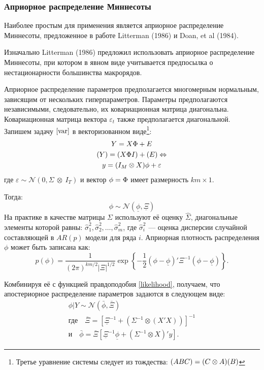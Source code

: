 \documentclass[11pt]{article} %
\let\vec\relax
\DeclareMathOperator{\vec}{vec}
\newcommand{\cN}{\mathcal{N}}
\begin{document}
\subsubsection{Априорное распределение Миннесоты}

Наиболее простым для применения является априорное распределение Миннесоты, предложенное в работе  Litterman (1986) и Doan, et al (1984).

Изначально Litterman (1986) предложил использовать априорное распределение Миннесоты, при котором в явном виде учитывается предпосылка о нестационарности большинства макрорядов.

Априорное распределение параметров предполагается многомерным нормальным, зависящим от нескольких гиперпараметров. Параметры предполагаются независимыми, следовательно, их ковариационная матрица диагональна. Ковариационная матрица вектора $\varepsilon_t$ также предполагается диагональной. Запишем задачу $\eqref{var}$ в векторизованном виде\footnote{Третье уравнение системы следует из тождества: $\vec(ABC)=(C\otimes A)\vec (B)$}:
\begin{gather*}
Y=X\Phi+E\\
\vec(Y)=\vec(X\Phi I)+\vec(E)\Leftrightarrow \\
y=(I_M\otimes X)\phi + \varepsilon
\end{gather*}
где $\varepsilon  \sim \cN(0,\varSigma\ \otimes\ I_T)$ и вектор $\phi=\vec{\Phi}$ имеет размерность $km\times 1$.

Тогда:
\begin{equation}
\phi\sim \cN(\underline \phi, \underline \Xi)
\end{equation}
На практике в качестве матрицы $\Sigma$ используют её оценку $\hat\Sigma$, диагональные элементы которой равны: $\hat\sigma_{1}^2, \hat\sigma_{2}^2,\ldots,\hat\sigma_{m}^2 $, где  $\hat\sigma_{i}^2$ --- оценка дисперсии случайной составляющей в $AR(p)$ модели для ряда $i$.
Априорная плотность распределения $\phi$ может быть записана как:
\begin{equation}
p(\phi)=\frac{1}{(2\pi)^{km/2}|\Xi|^{1/2}} \exp \left\lbrace-\frac{1}{2}(\phi-\underline \phi)'\Xi^{-1}(\phi-\underline \phi ) \right\rbrace.
\end{equation}

Комбинируя её с функцией правдоподобия \eqref{likelihood}, получаем, что апостериорное распределение параметров задаются в следующем виде:
\begin{gather}
\phi|Y\sim \cN(\bar{\phi},\bar \Xi)\\
\text{где}\quad \bar \Xi=[\underline \Xi^{-1}+(\varSigma^{-1}\otimes(X'X))]^{-1}\\
\text{и}\quad \bar{\phi}=\bar{\Xi}[\underline \Xi^{-1}\underline \phi+(\varSigma^{-1}\otimes X)'y].
\end{gather}
\end{document}
